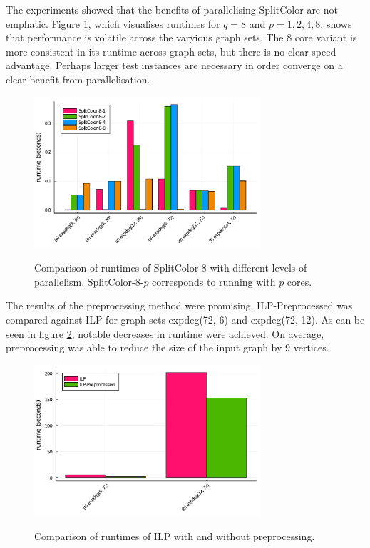 \documentclass[twocolumn]{article}
\begin{document}
The experiments showed that the benefits of parallelising SplitColor are not emphatic. Figure \ref{fig:splitcolor}, which visualises runtimes for $q = 8$ and $p = 1, 2, 4, 8$, shows that performance is volatile across the varyious graph sets. The 8 core variant is more consistent in its runtime across graph sets, but there is no clear speed advantage. Perhaps larger test instances are necessary in order converge on a clear benefit from parallelisation.

\begin{figure}
	\centering
	\caption{Comparison of runtimes of SplitColor-8 with different levels of parallelism. SplitColor-8-$p$ corresponds to running with $p$ cores.}
	\includegraphics[width=0.75\textwidth]{splitcolor_par.pdf}
	\label{fig:splitcolor}
\end{figure}

The results of the preprocessing method were promising. ILP-Preprocessed was compared against ILP for graph sets expdeg(72, 6) and expdeg(72, 12). As can be seen in figure \ref{fig:preprocess}, notable decreases in runtime were achieved. On average, preprocessing was able to reduce the size of the input graph by 9 vertices.

\begin{figure}
	\centering
	\caption{Comparison of runtimes of ILP with and without preprocessing.}
	\includegraphics[width=0.75\textwidth]{preprocessing.pdf}
	\label{fig:preprocess}
\end{figure}
\end{document}
